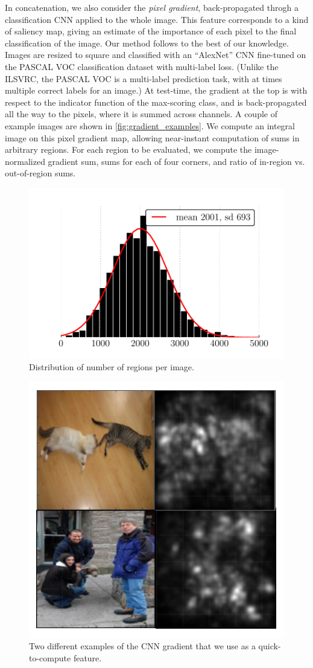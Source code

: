 In concatenation, we also consider the \emph{pixel gradient}, back-propagated throgh a classification CNN applied to the whole image.
This feature corresponds to a kind of saliency map, giving an estimate of the importance of each pixel to the final classification of the image.
Our method follows \cite{Simonyan-ICLR-2014} to the best of our knowledge.
Images are resized to square and classified with an ``AlexNet'' \cite{Krizhevsky-NIPS-2012} CNN fine-tuned on the PASCAL VOC classification dataset with multi-label loss.
(Unlike the ILSVRC, the PASCAL VOC is a multi-label prediction task, with at times multiple correct labels for an image.)
At test-time, the gradient at the top is with respect to the indicator function of the max-scoring class, and is back-propagated all the way to the pixels, where it is summed across channels.
A couple of example images are shown in \autoref{fig:gradient_examples}.
We compute an integral image on this pixel gradient map, allowing near-instant computation of sums in arbitrary regions.
For each region to be evaluated, we compute the image-normalized gradient sum, sums for each of four corners, and ratio of in-region vs. out-of-region sums.

\begin{figure}
\centering
\includegraphics[width=.66\linewidth]{../ccnn/figures/roi_hist.pdf}
\caption{
Distribution of number of regions per image.
}\label{fig:roi_hist}
\end{figure}

\begin{figure}
\centering
\includegraphics[width=.66\linewidth]{../ccnn/figures/gradient.pdf}
\caption{
Two different examples of the CNN gradient that we use as a quick-to-compute feature.
}\label{fig:gradient_examples}
\end{figure}

